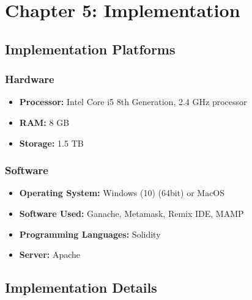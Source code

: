 \documentclass[12pt,a4paper,twocolumn,fleqn]{article}
\begin{document}
\section{Chapter 5: Implementation} 
\subsection{Implementation Platforms}
\subsubsection{Hardware}
\begin{itemize}
    \item \textbf{Processor:} Intel Core i5 8th Generation, 2.4 GHz processor
    \item \textbf{RAM:} 8 GB 
    \item \textbf{Storage:} 1.5 TB 
\end{itemize}
\subsubsection{Software}
\begin{itemize}
    \item \textbf{Operating System:} Windows (10) (64bit) or MacOS
    \item \textbf{Software Used:} Ganache, Metamask, Remix IDE, MAMP
    \item \textbf{Programming Languages:} Solidity
    \item \textbf{Server:} Apache
\end{itemize}
\subsection{Implementation Details}
\end{document}
